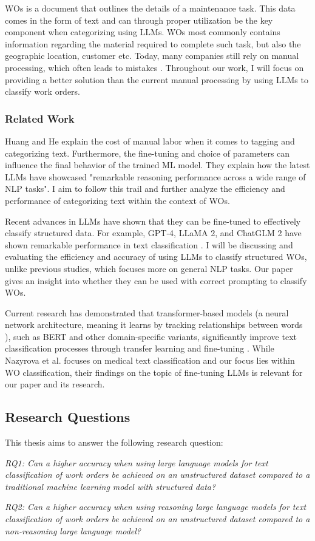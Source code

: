 WOs is a document that outlines the details of a maintenance task. This data
comes in the form of text and can through proper utilization be the key
component when categorizing using LLMs. WOs most commonly contains information regarding
the material required to complete such task, but also the geographic location, customer
etc. Today, many companies still rely on manual processing, which often leads to
mistakes \cite{ibm2023} \cite{li2024}. Throughout our work, I will focus on
providing a better solution than the current manual processing by using LLMs to
classify work orders.

\subsubsection{Related Work}

Huang and He \cite{huang2024} explain the cost of manual labor when it comes to tagging
and categorizing text. Furthermore, the fine-tuning and choice of parameters can
influence the final behavior of the trained ML model. They explain how the
latest LLMs have showcased "remarkable reasoning performance across a wide range
of NLP tasks". I aim to follow this trail and further analyze the efficiency and
performance of categorizing text within the context of WOs.

\bigskip
Recent advances in LLMs have shown that they can be fine-tuned to effectively classify
structured data. For example, GPT-4, LLaMA 2, and ChatGLM 2 have shown remarkable
performance in text classification \cite{zhang2024}. I will be discussing and
evaluating the efficiency and accuracy of using LLMs to classify structured WOs,
unlike previous studies, which focuses more on general NLP tasks. Our paper gives
an insight into whether they can be used with correct prompting to classify WOs.

\bigskip
Current research has demonstrated that transformer-based models (a neural
network architecture, meaning it learns by tracking relationships between words \cite{merritt2022}),
such as BERT and other domain-specific variants, significantly improve text
classification processes through transfer learning and fine-tuning
\cite{nazyrova2024}. While Nazyrova et al. focuses on medical text
classification and our focus lies within WO classification, their findings on the
topic of fine-tuning LLMs is relevant for our paper and its research.

\subsection{Research Questions}

This thesis aims to answer the following research question:

\bigskip
\textit{RQ1: Can a higher accuracy when using large language models for text classification
of work orders be achieved on an unstructured dataset compared to a traditional machine
learning model with structured data?}

\bigskip
\textit{RQ2: Can a higher accuracy when using reasoning large language models for
text classification of work orders be achieved on an unstructured dataset compared
to a non-reasoning large language model?}